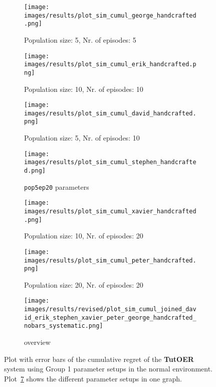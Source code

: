 \begin{figure}[ht]
	\begin{subfigure}{0.48\linewidth}
	\texttt{[image: images/results/plot\_sim\_cumul\_george\_handcrafted.png]}
	\caption{Population size: 5, Nr. of episodes: 5}
	\label{fig:cumul_handcrafted_george}
	\end{subfigure}
	\hfill
	\begin{subfigure}{0.48\linewidth}
	\texttt{[image: images/results/plot\_sim\_cumul\_erik\_handcrafted.png]}
	\caption{Population size: 10, Nr. of episodes: 10}
	\label{fig:cumul_handcrafted_erik}
	\end{subfigure}
	\begin{subfigure}{0.48\linewidth}
	\texttt{[image: images/results/plot\_sim\_cumul\_david\_handcrafted.png]}
	\caption{Population size: 5, Nr. of episodes: 10}
	\label{fig:cumul_handcrafted_david}
	\end{subfigure}
	\hfill
	\begin{subfigure}{0.48\linewidth}
	\texttt{[image: images/results/plot\_sim\_cumul\_stephen\_handcrafted.png]}
	\caption{\texttt{pop5ep20} parameters}
	\label{fig:cumul_handcrafted_stephen}
	\end{subfigure}
	\begin{subfigure}{0.48\linewidth}
	\texttt{[image: images/results/plot\_sim\_cumul\_xavier\_handcrafted.png]}
	\caption{Population size: 10, Nr. of episodes: 20}
	\label{fig:cumul_handcrafted_xavier}
	\end{subfigure}
	\hfill
	\begin{subfigure}{0.48\linewidth}
	\texttt{[image: images/results/plot\_sim\_cumul\_peter\_handcrafted.png]}
	\caption{Population size: 20, Nr. of episodes: 20}
	\label{fig:cumul_handcrafted_peter}
	\end{subfigure}
	\begin{subfigure}{\linewidth}
	\texttt{[image: images/results/revised/plot\_sim\_cumul\_joined\_david\_erik\_stephen\_xavier\_peter\_george\_handcrafted\_nobars\_systematic.png]}
	\caption{overview}
	\label{fig:cumul_handcrafted_overview_group1}
	\end{subfigure}
	\caption[Cumulative regret in normal simulated environment for group 1]{Plot with error bars of the cumulative regret of the \textbf{TutOER}
	system using Group 1 parameter setups in the normal environment.
	Plot~\ref{fig:cumul_handcrafted_overview_group1} shows the
	different parameter setups in one graph.}
	\label{fig:cumul_handcrafted_container_group1}
\end{figure}

